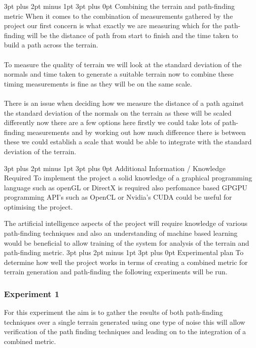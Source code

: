 \documentclass[12pt,a4paper]{article}
\makeatletter
\renewcommand\subsection{\@startsection {subsection}{1}{2mm} %
                               {3pt plus 2pt minus 1pt} %
                               {3pt plus 0pt} %
                               {\normalfont\bfseries}}
\makeatother
\begin{document}
\pagebreak
\subsection{Combining the terrain and path-finding metric}
When it comes to the combination of measurements gathered by the project our first concern is what exactly we are measuring which for the path-finding will be the distance of path from start to finish and the time taken to build a path across the terrain.\\\\To measure the quality of terrain we will look at the standard deviation of the normals and time taken to generate a suitable terrain now to combine these timing measurements is fine as they will be on the same scale.\\\\ There is an issue when deciding how we measure the distance of a path against the standard deviation of the normals on the terrain as these will be scaled differently now there are a few options here firstly we could take lots of path-finding measurements and by working out how much difference there is between these we could establish a scale that would be able to integrate with the standard deviation of the terrain.      


\subsection{Additional Information / Knowledge Required}
To implement the project a solid knowledge of a graphical programming language such as openGL or DirectX is required also perfomance based GPGPU programming API's  such as OpenCL or Nvidia's CUDA could be useful for optimising the project.

The artificial intelligence aspects of the project will require knowledge of various path-finding techniques and also an understanding of machine based learning would be beneficial to allow training of the system for analysis of the terrain and path-finding metric.   
\subsection{Experimental plan}
To determine how well the project works in terms of creating a combined metric for terrain generation and path-finding the following experiments will be run.

\subsubsection{Experiment 1}
For this experiment the aim is to gather the results of both path-finding techniques over a single terrain generated using one type of noise this will allow verification of the path finding techniques and leading on to the integration of a combined metric. 
\end{document}

